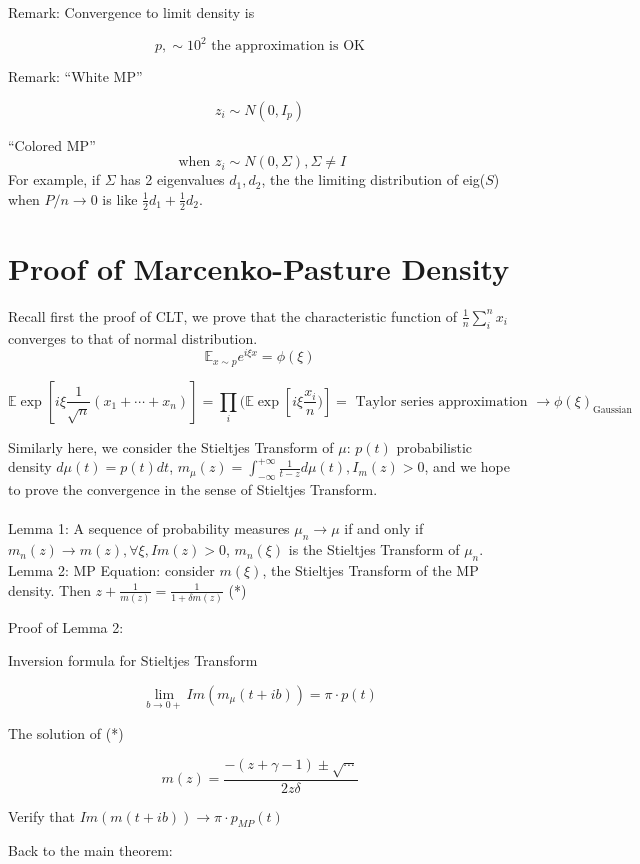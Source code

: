 \documentclass[12pt]{article}
\theoremstyle{plain}
\begin{document}
Remark: Convergence to limit density is 

$$ p , \sim 10^2 \text{  the approximation is OK} $$

Remark: ``White MP''

$$ z_i \sim N(0, I_p) $$



``Colored MP''
$$ \text{ when } z_i \sim N(0, \Sigma), \Sigma \neq I $$
For example, if $\Sigma$ has 2 eigenvalues $d_1, d_2$, the the limiting distribution of eig($S$) when $P/n \rightarrow 0$ is like $\frac{1}{2}d_1 + \frac{1}{2} d_2$.

\section*{Proof of Marcenko-Pasture Density}
Recall first the proof of CLT, we prove that the characteristic function of $\frac{1}{n}\sum_i^n x_i$ converges to that of normal distribution.
$$ \mathbb{E}_{x \sim p} e^{i \xi x} = \phi(\xi) $$

$$ \mathbb{E} \exp[i \xi \frac{1}{\sqrt{n}} (x_1 + \cdots + x_n)] = \prod_i ( \mathbb{E} \exp[i \xi \frac{x_i}{n})] = \text{ Taylor series approximation } \rightarrow \phi(\xi)_{\text{Gaussian}} $$

Similarly here, we consider the Stieltjes Transform of $\mu$: $p(t)$ probabilistic density $d \mu(t) = p(t) dt$, $m_\mu(z) = \int_{-\infty}^{+\infty} \frac{1}{t-z} d \mu(t), I_m(z) > 0$, and we hope to prove the convergence in the sense of Stieltjes Transform.\\
\\
Lemma 1: A sequence of probability measures $\mu_n \rightarrow \mu$ if and only if $m_n(z) \rightarrow m(z), \forall \xi, Im(z) > 0$, $m_n(\xi)$ is the Stieltjes Transform of $\mu_n$.\\
Lemma 2: MP Equation: consider $m(\xi)$, the Stieltjes Transform of the MP density. Then $ z + \frac{1}{m(z)} = \frac{1}{1+\delta m(z)}$ (*)

Proof of Lemma 2:

Inversion formula for Stieltjes Transform

$$ \lim_{b \rightarrow 0+} Im ( m_\mu (t + ib)) = \pi \cdot p(t) $$

The solution of (*)

$$ m(z) = \frac{-(z+ \gamma -1) \pm \sqrt{ \cdots}}{2 z \delta} $$

Verify that $Im(m(t+ib)) \rightarrow \pi \cdot p_{MP}(t)$

Back to the main theorem:
\end{document}
